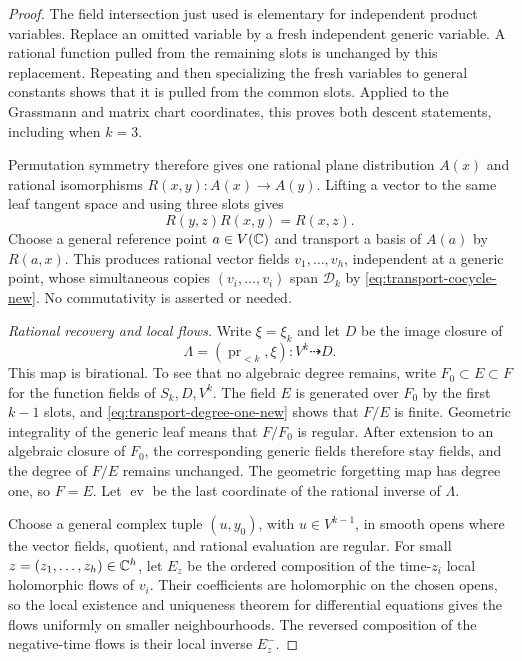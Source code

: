 \begin{proof}
The field intersection just used is elementary for independent
product variables. Replace an omitted variable by a fresh
independent generic variable. A rational function pulled from
the remaining slots is unchanged by this replacement. Repeating
and then specializing the fresh variables to general constants
shows that it is pulled from the common slots. Applied to the
Grassmann and matrix chart coordinates, this proves both descent
statements, including when $k=3$.

Permutation symmetry therefore gives one rational plane
distribution $A(x)$ and rational isomorphisms
$R(x,y):A(x)\to A(y)$. Lifting a vector to the same leaf tangent
space and using three slots gives
\begin{equation}\label{eq:transport-cocycle-new}
 R(y,z)R(x,y)=R(x,z).
\end{equation}
Choose a general reference point $a\in V(\mathbb C)$ and transport a
basis of $A(a)$ by $R(a,x)$. This produces rational vector fields
$v_1,\ldots,v_h$, independent at a generic point, whose simultaneous
copies $(v_i,\ldots,v_i)$ span $\mathcal D_k$ by
\eqref{eq:transport-cocycle-new}. No commutativity is asserted
or needed.

\medskip\noindent\emph{Rational recovery and local flows.}
Write $\xi=\xi_k$ and let $D$ be the image closure of
\[
 \Lambda=(\operatorname{pr}_{<k},\xi):V^k\dashrightarrow D.
\]
This map is birational. To see that no algebraic degree remains,
write $F_0\subset E\subset F$ for the function fields of
$S_k,D,V^k$. The field $E$ is generated over $F_0$ by the first
$k-1$ slots, and \eqref{eq:transport-degree-one-new} shows that
$F/E$ is finite. Geometric integrality of the generic leaf means
that $F/F_0$ is regular. After extension to an algebraic closure
of $F_0$, the corresponding generic fields therefore stay fields,
and the degree of $F/E$ remains unchanged. The geometric
forgetting map has degree one, so $F=E$.
Let $\operatorname{ev}$ be the last coordinate of the rational
inverse of $\Lambda$.

Choose a general complex tuple $(u,y_0)$, with $u\in V^{k-1}$,
in smooth opens where the vector fields, quotient, and rational
evaluation are regular. For small $z=(z_1,\ldots,z_h)\in\mathbb C^h$,
let $E_z$ be the ordered composition of the time-$z_i$ local
holomorphic flows of $v_i$. Their coefficients are holomorphic
on the chosen opens, so the local existence and uniqueness
theorem for differential equations gives the flows uniformly
on smaller neighbourhoods. The reversed composition of the
negative-time flows is their local inverse $E_z^-$.


\end{proof}
